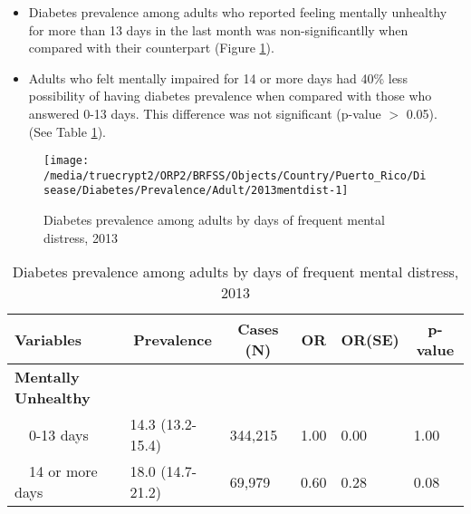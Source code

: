 \newpage
\begin{itemize}

\item Diabetes prevalence among adults who reported feeling mentally unhealthy for more than 13 days in the last month was non-significantlly  when compared with their counterpart (Figure \ref{fig:mental.Diabetes.2013}).


\item  Adults who felt mentally impaired for 14 or more days had 40\% less possibility of having diabetes prevalence when compared with those who answered 0-13 days. This difference was not significant (p-value $>$ 0.05). (See Table \ref{tab:mental.Diabetes.2013}).

\end{itemize}

\begin{figure}[H]
\centering
\caption{Diabetes prevalence among adults by days of frequent mental distress, 2013}
\label{fig:mental.Diabetes.2013}

\begin{knitrout}
\color{fgcolor}

{\centering \texttt{[image: /media/truecrypt2/ORP2/BRFSS/Objects/Country/Puerto\_Rico/Disease/Diabetes/Prevalence/Adult/2013mentdist-1]} 

}



\end{knitrout}
 \end{figure}

\begin{table}[H]
\caption{Diabetes prevalence among adults by days of frequent mental distress, 2013\label{tab:mental.Diabetes.2013}} 
\begin{center}
\begin{tabular}{llllll}
\hline\hline
\multicolumn{1}{l}{Variables}&\multicolumn{1}{c}{Prevalence}&\multicolumn{1}{c}{Cases (N)}&\multicolumn{1}{c}{OR}&\multicolumn{1}{c}{OR(SE)}&\multicolumn{1}{c}{p-value}\tabularnewline
\hline
{\bfseries Mentally Unhealthy}&&&&&\tabularnewline
~~0-13 days&14.3 (13.2-15.4)&344,215&1.00&0.00&1.00\tabularnewline
~~14 or more days&18.0 (14.7-21.2)& 69,979&0.60&0.28&0.08\tabularnewline
\hline
\end{tabular}\end{center}

\end{table}



